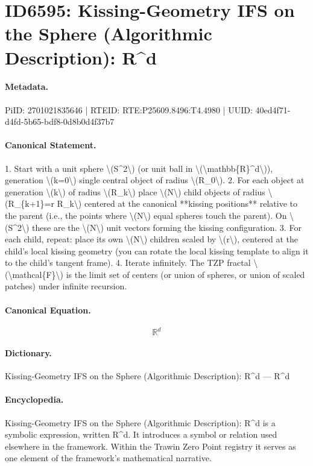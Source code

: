 \section*{ID6595: Kissing-Geometry IFS on the Sphere (Algorithmic Description): R\textasciicircum{}d}
\paragraph{Metadata.}
PiID: 2701021835646 | RTEID: RTE:P25609.8496:T4.4980 | UUID: 40ed4f71-d4fd-5b65-bdf8-0d8b0d4f37b7

\paragraph{Canonical Statement.}
1. Start with a unit sphere \textbackslash{}(S\textasciicircum{}2\textbackslash{}) (or unit ball in \textbackslash{}(\textbackslash{}mathbb\{R\}\textasciicircum{}d\textbackslash{})), generation \textbackslash{}(k=0\textbackslash{}) single central object of radius \textbackslash{}(R\_0\textbackslash{}). 2. For each object at generation \textbackslash{}(k\textbackslash{}) of radius \textbackslash{}(R\_k\textbackslash{}) place \textbackslash{}(N\textbackslash{}) child objects of radius \textbackslash{}(R\_\{k+1\}=r R\_k\textbackslash{}) centered at the canonical **kissing positions** relative to the parent (i.e., the points where \textbackslash{}(N\textbackslash{}) equal spheres touch the parent). On \textbackslash{}(S\textasciicircum{}2\textbackslash{}) these are the \textbackslash{}(N\textbackslash{}) unit vectors forming the kissing configuration. 3. For each child, repeat: place its own \textbackslash{}(N\textbackslash{}) children scaled by \textbackslash{}(r\textbackslash{}), centered at the child’s local kissing geometry (you can rotate the local kissing template to align it to the child’s tangent frame). 4. Iterate infinitely. The TZP fractal \textbackslash{}(\textbackslash{}mathcal\{F\}\textbackslash{}) is the limit set of centers (or union of spheres, or union of scaled patches) under infinite recursion.

\paragraph{Canonical Equation.}
\[
\mathbb{R}^d
\]

\paragraph{Dictionary.}
Kissing-Geometry IFS on the Sphere (Algorithmic Description): R\textasciicircum{}d — R\textasciicircum{}d

\paragraph{Encyclopedia.}
Kissing-Geometry IFS on the Sphere (Algorithmic Description): R\textasciicircum{}d is a symbolic expression, written R\textasciicircum{}d. It introduces a symbol or relation used elsewhere in the framework. Within the Trawin Zero Point registry it serves as one element of the framework's mathematical narrative.
